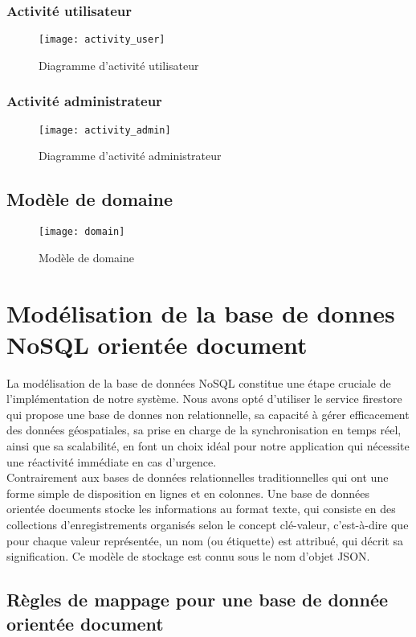 \subsubsection{Activité utilisateur}
\begin{figure}[H]
	\texttt{[image: activity\_user]}
	\caption{Diagramme d’activité utilisateur}
\end{figure}

\subsubsection{Activité administrateur}
\begin{figure}[H]
	\texttt{[image: activity\_admin]}
	\caption{Diagramme d’activité administrateur}
\end{figure}

\subsection{Modèle de domaine}
\begin{figure}[H]
	\texttt{[image: domain]}
	\caption{Modèle de domaine}
\end{figure}

\section{Modélisation de la base de donnes NoSQL orientée document}
La modélisation de la base de données NoSQL constitue une étape cruciale de l'implémentation de notre système. Nous avons opté d’utiliser le service firestore qui propose une base de donnes non relationnelle, sa capacité à gérer efficacement des données géospatiales, sa prise en charge de la synchronisation en temps réel, ainsi que sa scalabilité, en font un choix idéal pour notre application qui nécessite une réactivité immédiate en cas d'urgence.\\

Contrairement aux bases de données relationnelles traditionnelles qui ont une forme simple de disposition en lignes et en colonnes. Une base de données orientée documents stocke les informations au format texte, qui consiste en des collections d'enregistrements organisés selon le concept clé-valeur, c'est-à-dire que pour chaque valeur représentée, un nom (ou étiquette) est attribué, qui décrit sa signification. Ce  modèle de stockage est connu sous le nom d'objet JSON.

\subsection{Règles de mappage pour une base de donnée orientée document}
